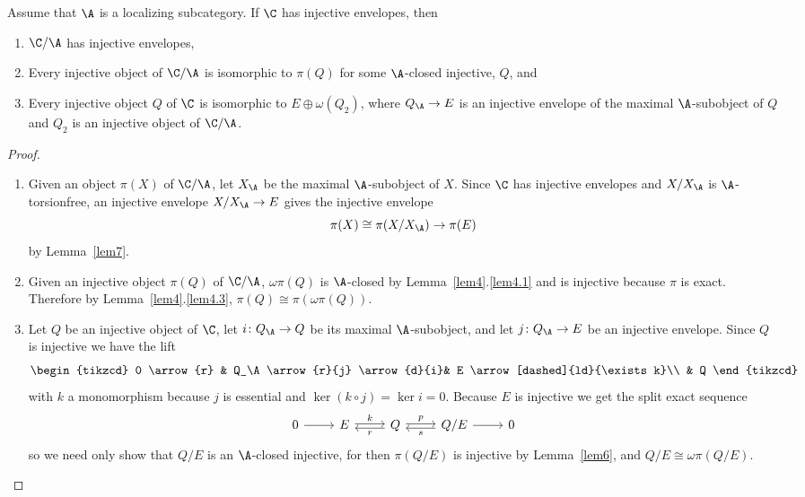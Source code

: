 \begin{prop}\label{prop1}
  Assume that $\A$ is a localizing subcategory.
  If $\C$ has injective envelopes, then
  \begin{enumerate}
  \item
    $\C/\A$ has injective envelopes,
  \item
    Every injective object of $\C/\A$ is isomorphic to $\pi(Q)$ for some $\A$-closed injective, $Q$, and
  \item
    Every injective object $Q$ of $\C$ is isomorphic to $E \oplus \omega(Q_2)$, where $Q_\A \rightarrow E$ is an injective envelope of the maximal $\A$-subobject of $Q$ and $Q_2$ is an injective object of $\C/\A$.
  \end{enumerate}
  
  \begin{proof}
    \begin{enumerate}
    \item
      Given an object $\pi(X)$ of $\C/\A$, let $X_\A$ be the maximal $\A$-subobject of $X$.
      Since $\C$ has injective envelopes and $X/X_\A$ is $\A$-torsionfree, an injective envelope $X/X_\A \rightarrow E$ gives the injective envelope
      $$\pi(X) \cong \pi(X/X_\A) \rightarrow \pi(E)$$
      by Lemma~\ref{lem7}.
    \item
      Given an injective object $\pi(Q)$ of $\C/\A$, $\omega\pi(Q)$ is $\A$-closed by Lemma~\ref{lem4}.\ref{lem4.1} and is injective because $\pi$ is exact.
      Therefore by Lemma~\ref{lem4}.\ref{lem4.3}, $\pi(Q) \cong \pi(\omega\pi(Q))$.
    \item
      Let $Q$ be an injective object of $\C$, let $i \colon Q_\A \rightarrow Q$ be its maximal $\A$-subobject, and let $j \colon Q_\A \rightarrow E$ be an injective envelope.
      Since $Q$ is injective we have the lift
      $$\begin{tikzcd}
        0 \arrow{r} & Q_\A \arrow{r}{j} \arrow{d}{i}& E \arrow[dashed]{ld}{\exists k}\\
        & Q
      \end{tikzcd}$$
      with $k$ a monomorphism because $j$ is essential and $\ker{(k \circ j)} = \ker{i} = 0$.
      Because $E$ is injective we get the split exact sequence
      $$\begin{tikzcd}
        0 \arrow{r} & E \arrow[shift left=0.5]{r}{k} & Q \arrow[shift left=0.5]{r}{p}\arrow[shift left=0.5ex]{l}{r} & Q/E \arrow[shift left=0.5ex]{l}{s} \arrow{r} & 0
      \end{tikzcd}$$
      so we need only show that $Q/E$ is an $\A$-closed injective, for then $\pi(Q/E)$ is injective by Lemma~\ref{lem6}, and $Q/E \cong \omega\pi(Q/E)$. 
      

\end{enumerate}
\end{proof}
\end{prop}
